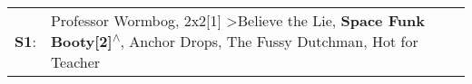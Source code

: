 \begin{supertabular}{p{0.03\textwidth}p{0.92\textwidth}}
 \textbf{S1}:  &  Professor Wormbog\textsuperscript{}, \enspace 2x2[1]\textsuperscript{} \textgreater \enspace Believe the Lie\textsuperscript{}, \enspace \textbf{Space Funk Booty[2]\textsuperscript{$\wedge$}}, \enspace Anchor Drops\textsuperscript{}, \enspace The Fussy Dutchman\textsuperscript{}, \enspace Hot for Teacher\textsuperscript{}  \enspace  \\
\end{supertabular}
